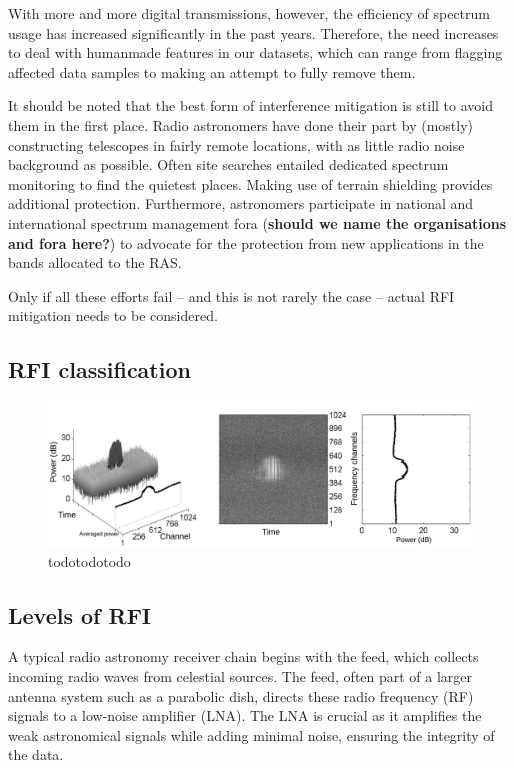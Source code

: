 With more and more digital transmissions, however, the efficiency of spectrum usage has increased significantly in the past years. Therefore, the need increases to deal with humanmade features in our datasets, which can range from flagging affected data samples to making an attempt to fully remove them.

It should be noted that the best form of interference mitigation is still to avoid them in the first place. Radio astronomers have done their part by (mostly) constructing telescopes in fairly remote locations, with as little radio noise background as possible. Often site searches entailed dedicated spectrum monitoring to find the quietest places. Making use of terrain shielding provides additional protection. Furthermore, astronomers participate in national and international spectrum management fora (\textbf{should we name the organisations and fora here?}) to advocate for the protection from new applications in the bands allocated to the RAS.

Only if all these efforts fail -- and this is not rarely the case -- actual RFI mitigation needs to be considered.

\subsection{RFI classification}
\label{subsection:hardware:introduction:classification}

\begin{figure}
    \centering
    \includegraphics[height=.20\textheight]{figures/radar.pdf}
    \caption{todotodotodo}
    \label{fig:rfi_example_radar}
\end{figure}

\subsection{Levels of RFI}
\label{subsection:hardware:introduction:levels}
A typical radio astronomy receiver chain begins with the feed, which collects incoming radio waves from celestial sources. The feed, often part of a larger antenna system such as a parabolic dish, directs these radio frequency (RF) signals to a low-noise amplifier (LNA). The LNA is crucial as it amplifies the weak astronomical signals while adding minimal noise, ensuring the integrity of the data.

